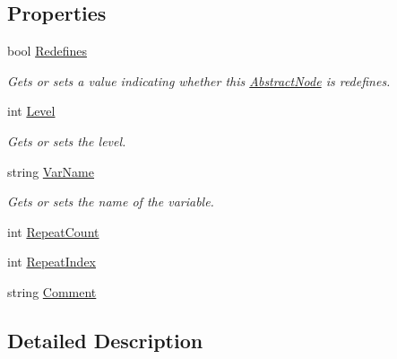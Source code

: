 \subsection*{Properties}
\begin{DoxyCompactItemize}
\item 
bool \hyperlink{class__1920_parser_1_1_abstract_node_a66fd8845fa232c78f396f15467e17458}{Redefines}
\begin{DoxyCompactList}\small\item\em Gets or sets a value indicating whether this \hyperlink{class__1920_parser_1_1_abstract_node}{Abstract\+Node} is redefines. \end{DoxyCompactList}\item 
int \hyperlink{class__1920_parser_1_1_abstract_node_a08c3c1dccbd57a5ddf4c6f2144223dc6}{Level}
\begin{DoxyCompactList}\small\item\em Gets or sets the level. \end{DoxyCompactList}\item 
string \hyperlink{class__1920_parser_1_1_abstract_node_ae4a8076d5cf940c9fa0b1a7fecdd4a6a}{Var\+Name}
\begin{DoxyCompactList}\small\item\em Gets or sets the name of the variable. \end{DoxyCompactList}\item 
int \hyperlink{class__1920_parser_1_1_abstract_node_a68d196e888509c7a603ea9f89124cd11}{Repeat\+Count}
\item 
int \hyperlink{class__1920_parser_1_1_abstract_node_a727fdfa1025e8c672a28c60bef03d9b9}{Repeat\+Index}
\item 
string \hyperlink{class__1920_parser_1_1_abstract_node_aff4df7a21266685abdac7a455a0f7ac8}{Comment}
\end{DoxyCompactItemize}


\subsection{Detailed Description}




